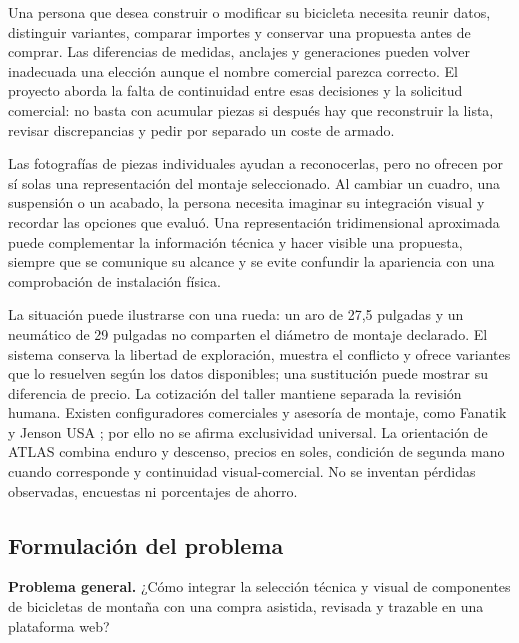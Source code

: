 \documentclass[12pt,letterpaper]{article}
\begin{document}
Una persona que desea construir o modificar su bicicleta necesita reunir datos, distinguir variantes, comparar importes y conservar una propuesta antes de comprar. Las diferencias de medidas, anclajes y generaciones pueden volver inadecuada una elección aunque el nombre comercial parezca correcto. El proyecto aborda la falta de continuidad entre esas decisiones y la solicitud comercial: no basta con acumular piezas si después hay que reconstruir la lista, revisar discrepancias y pedir por separado un coste de armado.

Las fotografías de piezas individuales ayudan a reconocerlas, pero no ofrecen por sí solas una representación del montaje seleccionado. Al cambiar un cuadro, una suspensión o un acabado, la persona necesita imaginar su integración visual y recordar las opciones que evaluó. Una representación tridimensional aproximada puede complementar la información técnica y hacer visible una propuesta, siempre que se comunique su alcance y se evite confundir la apariencia con una comprobación de instalación física.

La situación puede ilustrarse con una rueda: un aro de 27,5 pulgadas y un neumático de 29 pulgadas no comparten el diámetro de montaje declarado. El sistema conserva la libertad de exploración, muestra el conflicto y ofrece variantes que lo resuelven según los datos disponibles; una sustitución puede mostrar su diferencia de precio. La cotización del taller mantiene separada la revisión humana. Existen configuradores comerciales y asesoría de montaje, como Fanatik y Jenson USA \citep{fanatik,jenson}; por ello no se afirma exclusividad universal. La orientación de ATLAS combina enduro y descenso, precios en soles, condición de segunda mano cuando corresponde y continuidad visual-comercial. No se inventan pérdidas observadas, encuestas ni porcentajes de ahorro.

\subsection{Formulación del problema}
\textbf{Problema general.} ¿Cómo integrar la selección técnica y visual de componentes de bicicletas de montaña con una compra asistida, revisada y trazable en una plataforma web?
\end{document}
